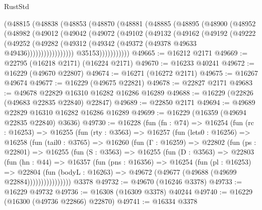 \begin{lexlean}{RustStd}
\begin{coremodule}
            (@48815
              (@48838
                (@48853
                  (@48870
                    (@48881
                      (@48885
                        (@48895
                          (@48900
                            (@48952
                              (@48982
                                (@49012
                                  (@49042
                                    (@49072
                                      (@49102
                                        (@49132
                                          (@49162
                                            (@49192
                                              (@49222
                                                (@49252
                                                  (@49282
                                                    (@49312
                                                      (@49342
                                                        (@49372
                                                          (@49378 @49633 @49436)))))))))))))))))
                          @35153)))))))))))
@49665 := @16212 @2171
@49669 := @22795 (@16218 @2171) (@16224 @2171)
@49670 := @16233 @40241
@49672 := @16229 (@49670 @22807)
@49674 := @16271 (@16272 @2171)
@49675 := @16267 @49674
@49677 := @16229 (@49675 @22821)
@49678 := @22827 @2171
@49683 := @49678 @22829 @16310 @16282 @16286 @16289
@49688 := @16229 (@22826 (@49683 @22835 @22840) @22847)
@49689 := @22850 @2171
@49694 := @49689 @22829 @16310 @16282 @16286 @16289
@49699 := @16229 (@16359 (@49694 @22835 @22840) @3636)
@49730 := @16228
    (fun (fn : @74) =>
    @16254
      (fun (rc : @16253) =>
      @16255
        (fun (rty : @3563) =>
        @16257
          (fun (lets0 : @16256) =>
          @16258
            (fun (tail0 : @3765) =>
            @16260
              (fun (Γ : @16259) =>
              @22802
                (fun (ps : @22801) =>
                @16255
                  (fun (S : @3563) =>
                  @16255
                    (fun (D : @3563) =>
                    @22803
                      (fun (hn : @44) =>
                      @16357
                        (fun (pns : @16356) =>
                        @16254
                          (fun (pl : @16253) =>
                          @22804
                            (fun (bodyL : @16263) =>
                            @49672 (@49677 (@49688 (@49699 @22884))))))))))))))))
    @3378
@49732 := @49670 (@16246 @3378)
@49733 := @16229 @49732
@49736 := @16308 (@16309 @3378) @40244
@49740 := @16229 (@16300 (@49736 @22866) @22870)
@49741 := @16334 @3378

\end{coremodule}
\end{lexlean}
